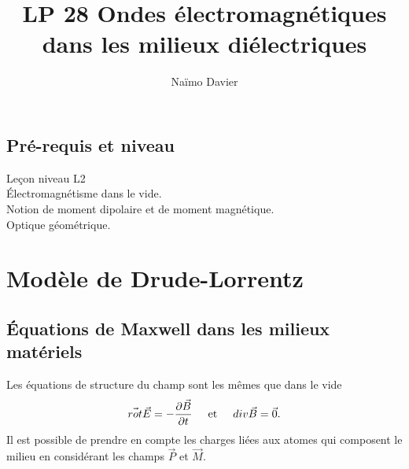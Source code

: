 \documentclass[12pt,prb,aps,epsf]{report}
\begin{document}
	
	\title{LP 28 Ondes électromagnétiques dans les milieux diélectriques}
	\author{Naïmo Davier}
	
	\maketitle
	
	\tableofcontents
	
	\pagebreak
	
\subsection{Pré-requis et niveau}
Leçon niveau L2\\
Électromagnétisme dans le vide.\\
Notion de moment dipolaire et de moment magnétique.\\
Optique géométrique.
	
\section{Modèle de Drude-Lorrentz}

\subsection{Équations de Maxwell dans les milieux matériels}
Les équations de structure du champ sont les mêmes que dans le vide
\begin{eqnarray}
\vec{rot} \vec{E} =- \frac{\partial \vec{B}}{\partial t}\hspace{0.5cm}\mathrm{et}\hspace{0.5cm} div \vec{B} = \vec{0}.
\end{eqnarray}
Il est possible de prendre en compte les charges liées aux atomes qui composent le milieu en considérant les champs $\vec{P}$ et $\vec{M}$.\\
\end{document}
